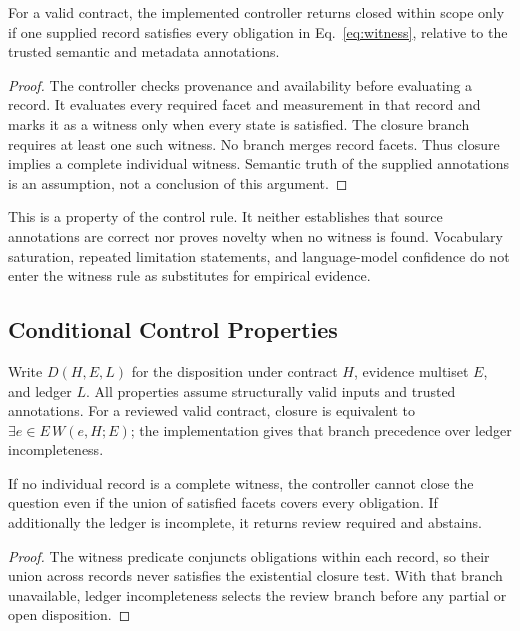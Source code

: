 \documentclass[runningheads]{llncs}
\begin{document}
\begin{proposition}
For a valid contract, the implemented controller returns \textnormal{closed within scope} only if one supplied record satisfies every obligation in Eq.~\ref{eq:witness}, relative to the trusted semantic and metadata annotations.
\end{proposition}
\begin{proof}
The controller checks provenance and availability before evaluating a record. It evaluates every required facet and measurement in that record and marks it as a witness only when every state is satisfied. The closure branch requires at least one such witness. No branch merges record facets. Thus closure implies a complete individual witness. Semantic truth of the supplied annotations is an assumption, not a conclusion of this argument.
\end{proof}
This is a property of the control rule. It neither establishes that source annotations are correct nor proves novelty when no witness is found. Vocabulary saturation, repeated limitation statements, and language-model confidence do not enter the witness rule as substitutes for empirical evidence.

\subsection{Conditional Control Properties}
Write $D(H,E,L)$ for the disposition under contract $H$, evidence multiset $E$, and ledger $L$. All properties assume structurally valid inputs and trusted annotations. For a reviewed valid contract, closure is equivalent to $\exists e\in E\,W(e,H;E)$; the implementation gives that branch precedence over ledger incompleteness.

\begin{proposition}
If no individual record is a complete witness, the controller cannot close the question even if the union of satisfied facets covers every obligation. If additionally the ledger is incomplete, it returns \textnormal{review required} and abstains.
\end{proposition}
\begin{proof}
The witness predicate conjuncts obligations within each record, so their union across records never satisfies the existential closure test. With that branch unavailable, ledger incompleteness selects the review branch before any partial or open disposition.
\end{proof}
\end{document}
